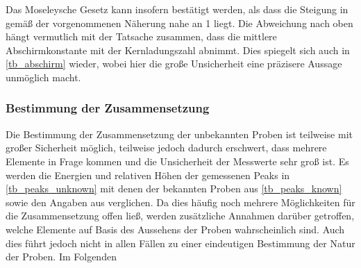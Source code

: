 \documentclass[
	a4paper,
	12pt,
	pagesize,
	ngerman
]{scrartcl}
\begin{document}
	Das Moseleysche Gesetz kann insofern bestätigt werden, als dass die Steigung in  gemäß der vorgenommenen Näherung nahe an \num{1} liegt.
	Die Abweichung nach oben hängt vermutlich mit der Tatsache zusammen, dass die mittlere Abschirmkonstante mit der Kernladungszahl abnimmt.
	Dies spiegelt sich auch in \cref{tb_abschirm} wieder, wobei hier die große Unsicherheit eine präzisere Aussage unmöglich macht.
	
	\subsubsection{Bestimmung der Zusammensetzung}
	Die Bestimmung der Zusammensetzung der unbekannten Proben ist teilweise mit großer Sicherheit möglich, teilweise jedoch dadurch erschwert, dass mehrere Elemente in Frage kommen und die Unsicherheit der Messwerte sehr groß ist.
	Es werden die Energien und relativen Höhen der gemessenen Peaks in \cref{tb_peaks_unknown} mit denen der bekannten Proben aus \cref{tb_peaks_known} sowie den Angaben aus \cite{XRAYDB} verglichen.
	Da dies häufig noch mehrere Möglichkeiten für die Zusammensetzung offen ließ, werden zusätzliche Annahmen darüber getroffen, welche Elemente auf Basis des Aussehens der Proben wahrscheinlich sind.
	Auch dies führt jedoch nicht in allen Fällen zu einer eindeutigen Bestimmung der Natur der Proben.
	Im Folgenden %
	
\end{document}
